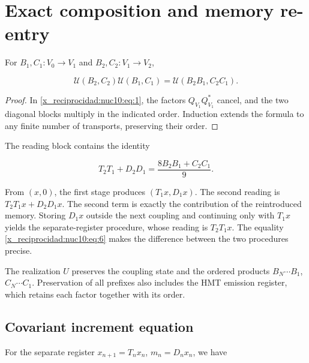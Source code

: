 \section{Exact composition and memory re-entry}

For \(B_1,C_1:V_0\to V_1\) and \(B_2,C_2:V_1\to V_2\),



\begin{equation}
\boxed{\mathcal U(B_2,C_2)\mathcal U(B_1,C_1)
=\mathcal U(B_2B_1,C_2C_1).}
\label{x_reciprocidad:nuc10:eq:5}
\end{equation}



\begin{proof}
In \eqref{x_reciprocidad:nuc10:eq:1}, the factors \(Q_{V_1}Q_{V_1}^*\) cancel, and the two diagonal blocks multiply in the indicated order. Induction extends the formula to any finite number of transports, preserving their order.
\end{proof}

The reading block contains the identity



\begin{equation}
\boxed{T_2T_1+D_2D_1=\frac{8B_2B_1+C_2C_1}{9}.}
\label{x_reciprocidad:nuc10:eq:6}
\end{equation}



From \((x,0)\), the first stage produces \((T_1x,D_1x)\). The second reading is \(T_2T_1x+D_2D_1x\). The second term is exactly the contribution of the reintroduced memory. Storing \(D_1x\) outside the next coupling and continuing only with \(T_1x\) yields the separate-register procedure, whose reading is \(T_2T_1x\). The equality \eqref{x_reciprocidad:nuc10:eq:6} makes the difference between the two procedures precise.

The realization \(U\) preserves the coupling state and the ordered products \(B_N\cdots B_1\), \(C_N\cdots C_1\). Preservation of all prefixes also includes the HMT emission register, which retains each factor together with its order.

\subsection{Covariant increment equation}

For the separate register \(x_{n+1}=T_nx_n\), \(m_n=D_nx_n\), we have



